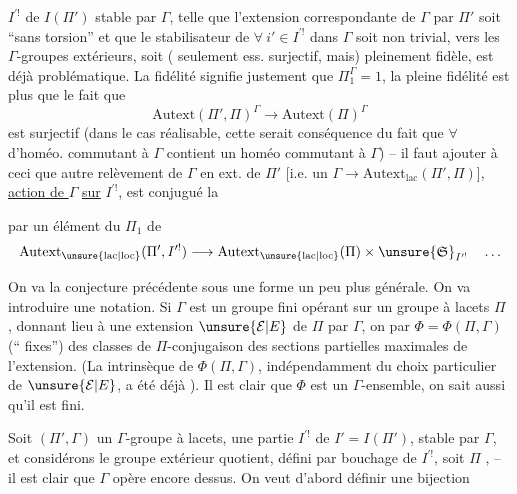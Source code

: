 $I^{\prime!}$ de $I(\Pi')$ stable par $\Gamma$, telle que l'extension correspondante de $\Gamma$ par $\Pi'$ soit ``sans torsion'' et que le stabilisateur de $\forall\ i'\in I^{\prime!}$ dans $\Gamma$ soit non trivial, vers les $\Gamma$-groupes extérieurs, soit ( seulement ess. surjectif, mais) pleinement fidèle, est déjà problématique. La fidélité signifie justement que $\Pi_1^\Gamma=1$, la pleine fidélité est plus  que le fait que 
\[
\mathrm{Autext}(\Pi',\Pi)^\Gamma\longrightarrow\mathrm{Autext}(\Pi)^\Gamma
\]
est surjectif (dans le cas réalisable, cette  serait conséquence du fait que $\forall$  d'homéo. commutant à $\Gamma$ contient un homéo commutant à $\Gamma$)
-- il faut ajouter à ceci que  autre relèvement de $\Gamma$ en  ext. de $\Pi'$ [i.e. un $\Gamma\longrightarrow\mathrm{Autext}_{\mathrm{lac}}(\Pi',\Pi)$\inserted{\diagram{[Sous le terme $\mathrm{Autext}_{\mathrm{lac}}(\Pi',\Pi)$, $\mathrm{Autext}_{\mathrm{lac}}(\Pi',I)$, relié au terme supérieur par un signe vertical \unsure{$=$|$\simeq$}.]}}],    \uline{action de $\Gamma$} \uline{sur} $I^{\prime!}$, est conjugué  la

 par un élément du  $\Pi_1$ de
\[
\mathrm{Autext}_{\unsure{\mathrm{lac}|\mathrm{loc}}}(\Pi',I^{\prime!})
\longrightarrow
\mathrm{Autext}_{\unsure{\mathrm{lac}|\mathrm{loc}}}(\Pi)
\times \unsure{\mathfrak S}_{I^{\prime!}}\quad\ldots
\]

On va  la conjecture précédente sous une forme un peu plus générale.
On va introduire une notation. Si $\Gamma$ est un groupe fini opérant 
 sur un groupe à lacets $\Pi$ ,
donnant lieu à une extension $\unsure{\mathcal E|E}$ de $\Pi$ par $\Gamma$,
on   par $\Phi=\Phi(\Pi,\Gamma)$ (`` fixes'')
 des classes de $\Pi$-conjugaison des sections partielles
 maximales de l'extension.
(La  intrinsèque de $\Phi(\Pi,\Gamma)$, indépendamment du choix particulier de $\unsure{\mathcal E|E}$, a été déjà ).
Il est clair que $\Phi$ est un $\Gamma$-ensemble, on sait aussi qu'il est fini.

Soit  $(\Pi',\Gamma)$ un $\Gamma$-groupe 
à lacets,   une partie
$I^{\prime!}$ de $I'=I(\Pi')$, stable par $\Gamma$,
et considérons le groupe extérieur quotient, défini par bouchage de $I^{\prime!}$,
soit $\Pi$ , -- il est clair que $\Gamma$ opère encore dessus.
On veut d'abord définir une bijection

